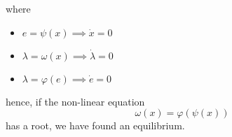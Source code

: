 \documentclass[../../main.tex]{subfiles}
\begin{document}
where \begin{itemize}
    \item $e = \psi(x) \implies \dot{x} = 0$
    \item $\lambda = \omega(x) \implies \dot{\lambda} = 0$
    \item $\lambda = \varphi(e) \implies \dot{e} = 0$
\end{itemize}

hence, if the non-linear equation \begin{equation}
    \omega(x) = \varphi(\psi(x))
\end{equation} has a root, we have found an equilibrium.
\end{document}
